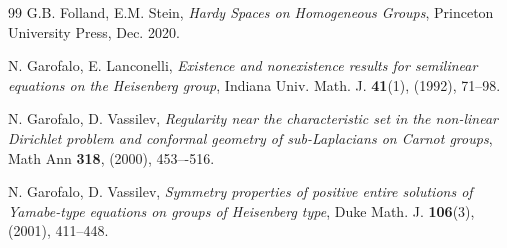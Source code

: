 \documentclass[11pt]{amsart}
\numberwithin{equation}{section} %
\theoremstyle{definition}
\begin{document}
\begin{thebibliography}{99}
	G.B. Folland, E.M. Stein,
	{\em Hardy {{Spaces}} on {{Homogeneous
				Groups}}}, Princeton University Press, Dec. 2020.
	
	
	
%	
%	
	
	
	N. Garofalo, E. Lanconelli, 
	{\em Existence and nonexistence results for
		semilinear equations on the Heisenberg group},
	Indiana Univ. Math. J. {\bf 41}(1), (1992), 71--98.

	N. Garofalo, D. Vassilev, 
	{\em Regularity near the characteristic set in the non-linear Dirichlet problem and conformal geometry of sub-Laplacians on Carnot groups}, 
	Math Ann {\bf 318}, (2000), 453–-516.
	
	
	N. Garofalo, D. Vassilev, 
	{\em Symmetry properties of positive entire solutions of Yamabe-type equations on groups of Heisenberg type}, Duke Math. J. {\bf 106}(3), (2001), 411--448.
	
	
	
	
	

\end{thebibliography}
\end{document}
